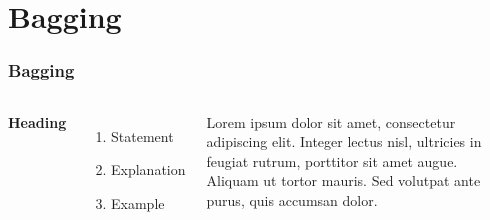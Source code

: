 \section{Bagging}

\begin{frame}
    \frametitle{Bagging}
    \begin{columns}[c] %
    
    \textbf{Heading}
    \begin{enumerate}
    \item Statement
    \item Explanation
    \item Example
    \end{enumerate}
    
    Lorem ipsum dolor sit amet, consectetur adipiscing elit. Integer lectus nisl, ultricies in feugiat rutrum, porttitor sit amet augue. Aliquam ut tortor mauris. Sed volutpat ante purus, quis accumsan dolor.
    
    \end{columns}
\end{frame}